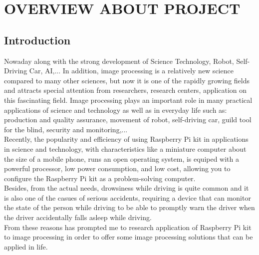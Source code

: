 \chapter{OVERVIEW ABOUT PROJECT}

\renewcommand{\headrulewidth}{0.5pt}
\renewcommand{\footrulewidth}{0.5pt}
\thispagestyle{plain}
\pagestyle{fancy}
\fancyhf{}
\raggedright
{}

\justifying

\section{Introduction}
    Nowaday along with the strong development of Science Technology, Robot, Self-Driving Car, 
    AI,... In addition, image processing is a relatively new science compared to many other sciences, but now 
    it is one of the rapidly growing fields and attracts special attention from researchers, research centers, 
    application on this fascinating field. Image processing plays an important role in many practical applications 
    of science and technology as well as in everyday life such as: production and quality assurance, movement of robot, 
    self-driving car, guild tool for the blind, security and monitoring,... \\ 
    \vspace{3mm}
    Recently, the popularity and efficiency of using Raspberry Pi kit in applications in science and technology, 
    with characteristics like a miniature computer about the size of a mobile phone, runs an open operating system, 
    is equiped with a powerful processor, low power consumption, and low cost, allowing you to configure the Raspberry 
    Pi kit as a problem-solving computer. \\ 
    \vspace{3mm}
    Besides, from the actual needs, drowsiness while driving is quite common and it is also one of the casues of serious 
    accidents, requiring a device that can monitor the state of the person while driving to be able to promptly 
    warn the driver when the driver accidentally falls asleep while driving. \\ 
    \vspace{3mm}
    From these reasons has prompted me to research application of Raspberry Pi kit to image processing in order to offer 
    some image processing solutions that can be applied in life.


